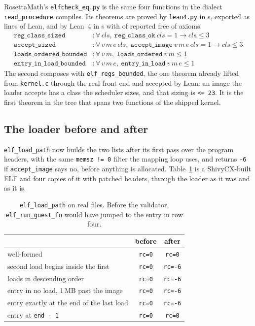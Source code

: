 \documentclass[11pt]{article}
\begin{document}
RosettaMath's \texttt{elfcheck\_eq.py} is the same four functions in the
dialect \texttt{read\_procedure} compiles.  Its \elfTheorems{} theorems are
proved by \texttt{lean4.py} in \elfBuildSeconds{}s, exported as
\elfLeanLines{} lines of Lean, and \elfLeanVerdict{} by Lean~4 in
\elfLeanSeconds{}s with \elfLeanNoAxioms{} of \elfTheorems{} reported free
of axioms:
\begin{align*}
\texttt{reg\_class\_sized} &: \forall\,\mathit{cls},\ \texttt{reg\_class\_ok}\ \mathit{cls} = 1 \to \mathit{cls} \le 3\\
\texttt{accept\_sized} &: \forall\,v\,m\,e\,\mathit{cls},\ \texttt{accept\_image}\ v\,m\,e\,\mathit{cls} = 1 \to \mathit{cls} \le 3\\
\texttt{loads\_ordered\_bounded} &: \forall\,v\,m,\ \texttt{loads\_ordered}\ v\,m \le 1\\
\texttt{entry\_in\_load\_bounded} &: \forall\,v\,m\,e,\ \texttt{entry\_in\_load}\ v\,m\,e \le 1
\end{align*}
The second composes with \texttt{elf\_regs\_bounded}, the one theorem
already lifted from \texttt{kernel.c} through the real front end and
accepted by Lean: an image the loader accepts has a class the scheduler
sizes, and that sizing is \texttt{<= 23}.  It is the first theorem in the
tree that spans two functions of the shipped kernel.

\subsection{The loader before and after}

\texttt{elf\_load\_path} now builds the two lists after its first pass
over the program headers, with the same \texttt{memsz != 0} filter the
mapping loop uses, and returns \texttt{-6} if \texttt{accept\_image} says
no, before anything is allocated.  Table~\ref{tab:loader} is a
ShivyCX-built ELF and four copies of it with patched headers, through the
loader as it was and as it is.

\begin{table}[h]\centering
\begin{tabular}{lcc}
\toprule
& before & after\\
\midrule
well-formed & \texttt{rc=0} & \texttt{rc=0}\\
second load begins inside the first & \texttt{rc=0} & \texttt{rc=-6}\\
loads in descending order & \texttt{rc=0} & \texttt{rc=-6}\\
entry in no load, 1\,MB past the image & \texttt{rc=0} & \texttt{rc=-6}\\
entry exactly at the end of the last load & \texttt{rc=0} & \texttt{rc=-6}\\
entry at \texttt{end - 1} & \texttt{rc=0} & \texttt{rc=0}\\
\bottomrule
\end{tabular}
\caption{\texttt{elf\_load\_path} on real files.  Before the validator,
\texttt{elf\_run\_guest\_fn} would have jumped to the entry in row four.}
\label{tab:loader}
\end{table}
\end{document}
